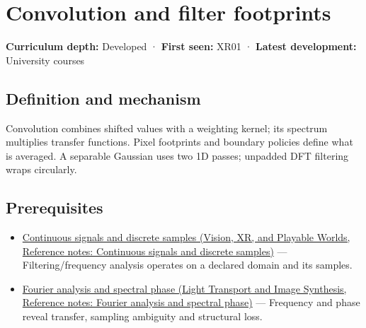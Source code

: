 \hypertarget{appendix-d5b3c692d9f0}{}\label{referencestart:appendix-d5b3c692d9f0}
\section{Convolution and filter footprints}\label{appendix-d5b3c692d9f0-convolution-and-filter-footprints}

\hypertarget{appendix-d5b3c692d9f0-convolution-and-filter-footprints}{}

\textbf{Curriculum depth:} Developed · \textbf{First seen:} XR01 · \textbf{Latest development:} University courses

\begin{allmightroledefinition}

\subsection{Definition and mechanism}\label{appendix-d5b3c692d9f0-definition-and-mechanism}

\hypertarget{appendix-d5b3c692d9f0-definition-and-mechanism}{}

Convolution combines shifted values with a weighting kernel; its spectrum multiplies transfer functions. Pixel footprints and boundary policies define what is averaged. A separable Gaussian uses two 1D passes; unpadded DFT filtering wraps circularly.

\end{allmightroledefinition}

\subsection{Prerequisites}\label{appendix-d5b3c692d9f0-prerequisites}

\hypertarget{appendix-d5b3c692d9f0-prerequisites}{}

\begin{itemize}
\tightlist
\item
  \href{../07-Vision-XR-and-Playable-Worlds/main.pdf\#nameddest=appendix-1077ea8fc737}{Continuous signals and discrete samples (Vision, XR, and Playable Worlds, Reference notes: Continuous signals and discrete samples)} --- Filtering/frequency analysis operates on a declared domain and its samples.
\item
  \href{../04-Light-Transport-and-Image-Synthesis/main.pdf\#nameddest=appendix-b60686ba06a1}{Fourier analysis and spectral phase (Light Transport and Image Synthesis, Reference notes: Fourier analysis and spectral phase)} --- Frequency and phase reveal transfer, sampling ambiguity and structural loss.
\end{itemize}

